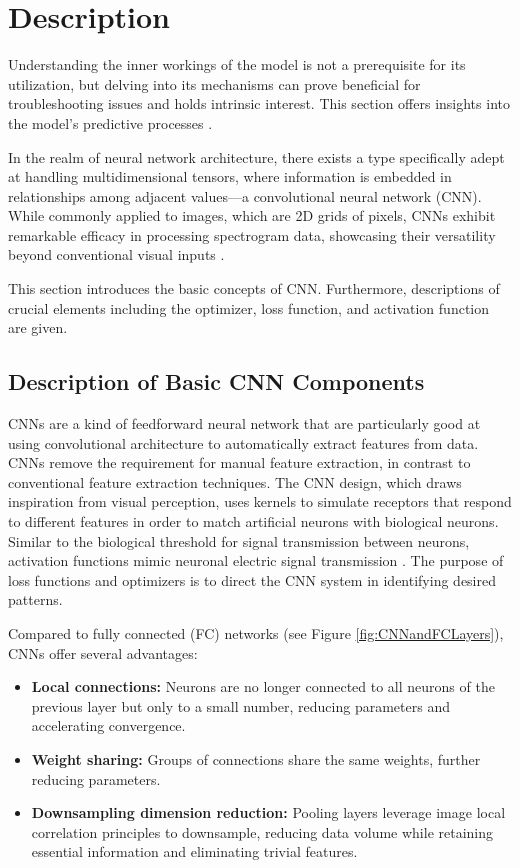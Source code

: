 \section{Description}

Understanding the inner workings of the model is not a prerequisite for its utilization, but delving into its mechanisms can prove beneficial for troubleshooting issues and holds intrinsic interest. This section offers insights into the model's predictive processes \cite{War:2020}.

In the realm of neural network architecture, there exists a type specifically adept at handling multidimensional tensors, where information is embedded in relationships among adjacent values—a convolutional neural network (CNN). While commonly applied to images, which are 2D grids of pixels, CNNs exhibit remarkable efficacy in processing spectrogram data, showcasing their versatility beyond conventional visual inputs \cite{War:2020}.

This section introduces the basic concepts of CNN. Furthermore, descriptions of crucial elements including the optimizer, loss function, and activation function are given.

\subsection{Description of Basic CNN Components}

CNNs are a kind of feedforward neural network that are particularly good at using convolutional architecture to automatically extract features from data. CNNs remove the requirement for manual feature extraction, in contrast to conventional feature extraction techniques. The CNN design, which draws inspiration from visual perception, uses kernels to simulate receptors that respond to different features in order to match artificial neurons with biological neurons. Similar to the biological threshold for signal transmission between neurons, activation functions mimic neuronal electric signal transmission \cite{Li:2021}. The purpose of loss functions and optimizers is to direct the CNN system in identifying desired patterns.

Compared to fully connected (FC) networks (see Figure \ref{fig:CNNandFCLayers}), CNNs offer several advantages:

\begin{itemize}
	\item \textbf{Local connections:} Neurons are no longer connected to all neurons of the previous layer but only to a small number, reducing parameters and accelerating convergence.
	\item \textbf{Weight sharing:} Groups of connections share the same weights, further reducing parameters.
	\item \textbf{Downsampling dimension reduction:} Pooling layers leverage image local correlation principles to downsample, reducing data volume while retaining essential information and eliminating trivial features.
\end{itemize}

